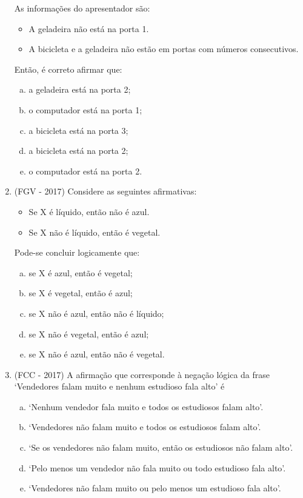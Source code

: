 \begin{enumerate}
As informações do apresentador são:
\begin{itemize}
 \item A geladeira não está na porta 1.
 \item A bicicleta e a geladeira não estão em portas com números consecutivos.
\end{itemize}
Então, é correto afirmar que:
\begin{enumerate}[a)]
\item a geladeira está na porta 2;
\item o computador está na porta 1;
\item a bicicleta está na porta 3;
\item a bicicleta está na porta 2;
\item o computador está na porta 2.
\end{enumerate}

\item (FGV - 2017) Considere as seguintes afirmativas:
\begin{itemize}
\item Se X é líquido, então não é azul.
\item Se X não é líquido, então é vegetal.
\end{itemize}
Pode-se concluir logicamente que:
\begin{enumerate}[a)]
\item se X é azul, então é vegetal;
\item se X é vegetal, então é azul;
\item se X não é azul, então não é líquido;
\item se X não é vegetal, então é azul;
\item se X não é azul, então não é vegetal.
\end{enumerate}

\item (FCC - 2017) A afirmação que corresponde à negação lógica da frase ‘Vendedores falam muito e nenhum estudioso fala alto’ é
\begin{enumerate}[a)]
\item ‘Nenhum vendedor fala muito e todos os estudiosos falam alto’.
\item ‘Vendedores não falam muito e todos os estudiosos falam alto’.
\item ‘Se os vendedores não falam muito, então os estudiosos não falam alto’.
\item ‘Pelo menos um vendedor não fala muito ou todo estudioso fala alto’.
\item ‘Vendedores não falam muito ou pelo menos um estudioso fala alto’.
\end{enumerate}


\end{enumerate}
